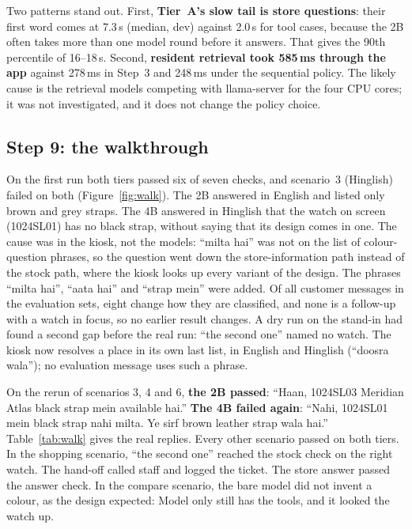\documentclass[11pt,a4paper]{article}
\begin{document}
Two patterns stand out. First, \textbf{Tier~A's slow tail is store questions}: their first word comes at 7.3\,s
(median, dev) against 2.0\,s for tool cases, because the 2B often takes more than one model round before it answers.
That gives the 90th percentile of 16--18\,s. Second, \textbf{resident retrieval took 585\,ms through the app} against
278\,ms in Step~3 and 248\,ms under the sequential policy. The likely cause is the retrieval models competing with
llama-server for the four CPU cores; it was not investigated, and it does not change the policy choice.

\subsection{Step 9: the walkthrough}\label{sec:walk}
On the first run both tiers passed six of seven checks, and scenario~3 (Hinglish) failed on both
(Figure~\ref{fig:walk}). The 2B answered in English and listed only brown and grey straps. The 4B answered in Hinglish
that the watch on screen (1024SL01) has no black strap, without saying that its design comes in one. The cause was in the
kiosk, not the models: ``milta hai'' was not on the list of colour-question phrases, so the question went down the
store-information path instead of the stock path, where the kiosk looks up every variant of the design. The phrases
``milta hai'', ``aata hai'' and ``strap mein'' were added. Of all customer messages in the evaluation sets, eight change
how they are classified, and none is a follow-up with a watch in focus, so no earlier result changes. A dry run on the
stand-in had found a second gap before the real run: ``the second one'' named no watch. The kiosk now resolves a place in
its own last list, in English and Hinglish (``doosra wala''); no evaluation message uses such a phrase.

On the rerun of scenarios 3, 4 and 6, \textbf{the 2B passed}: ``Haan, 1024SL03 Meridian Atlas black strap mein
available hai.'' \textbf{The 4B failed again}: ``Nahi, 1024SL01 mein black strap nahi milta. Ye sirf brown leather strap
wala hai.'' Table~\ref{tab:walk} gives the real replies. Every other scenario passed on both tiers. In the shopping
scenario, ``the second one'' reached the stock check on the right watch. The hand-off called staff and logged the
ticket. The store answer passed the answer check. In the compare scenario, the bare model did not invent a colour, as the
design expected: Model only still has the tools, and it looked the watch up.
\end{document}
